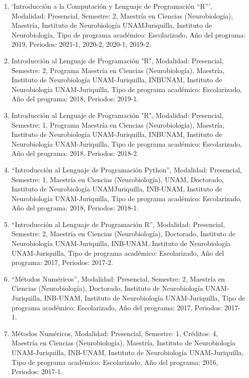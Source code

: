 \begin{enumerate}
\item ‘Introducción a la Computación y Lenguaje de Programación “R”’, Modalidad: Presencial, Semestre: 2, Maestría en Ciencias 
(Neurobiología), Maestría, Instituto de Neurobiología UNAMJuriquilla, Instituto de Neurobiología, Tipo de programa 
académico: Escolarizado, Año del programa: 2019, Periodos: 2021-1, 2020-2, 2020-1, 2019-2.

\item Introducción al Lenguaje de Programación "R", Modalidad: Presencial, Semestre: 2, Programa Maestría en Ciencias 
(Neurobiología), Maestría, Instituto de Neurobiología UNAM-Juriquilla, INBUNAM, Instituto de Neurobiología UNAM-Juriquilla, 
Tipo de programa académico: Escolarizado, Año del programa: 2018, Periodos: 2019-1.

\item Introducción al Lenguaje de Programación "R", Modalidad: Presencial, Semestre: 1, Programa Maestría en Ciencias 
(Neurobiología), Maestría, Instituto de Neurobiología UNAM-Juriquilla, INBUNAM, Instituto de Neurobiología UNAM-Juriquilla, 
Tipo de programa académico: Escolarizado, Año del programa: 2018, Periodos: 2018-2.

\item “Introducción al Lenguaje de Programación Python”, Modalidad: Presencial, Semestre: 1, Maestría en Ciencias 
(Neurobiología), UNAM, Doctorado, Instituto de Neurobiología UNAMJuriquilla, INB-UNAM, Instituto de Neurobiología 
UNAM-Juriquilla, Tipo de programa académico: Escolarizado, Año del programa: 2018, Periodos: 2018-1.

\item “Introducción al Lenguaje de Programación R”, Modalidad: Presencial, Semestre: 2, Maestría en Ciencias (Neurobiología), 
Doctorado, Instituto de Neurobiología UNAM-Juriquilla, INB-UNAM, Instituto de Neurobiología UNAM-Juriquilla, Tipo de 
programa académico: Escolarizado, Año del programa: 2017, Periodos: 2017-2.

\item “Métodos Numéricos”, Modalidad: Presencial, Semestre: 2, Maestría en Ciencias (Neurobiología), Doctorado, Instituto de 
Neurobiología UNAM-Juriquilla, INB-UNAM, Instituto de Neurobiología UNAM-Juriquilla, Tipo de programa académico: 
Escolarizado, Año del programa: 2017, Periodos: 2017-1.

\item Métodos Numéricos, Modalidad: Presencial, Semestre: 1, Créditos: 4, Maestría en Ciencias (Neurobiología), Maestría, 
Instituto de Neurobiología UNAM-Juriquilla, INB-UNAM, Instituto de Neurobiología UNAM-Juriquilla, Tipo de programa 
académico: Escolarizado, Año del programa: 2016, Periodos: 2017-1.


\end{enumerate}
